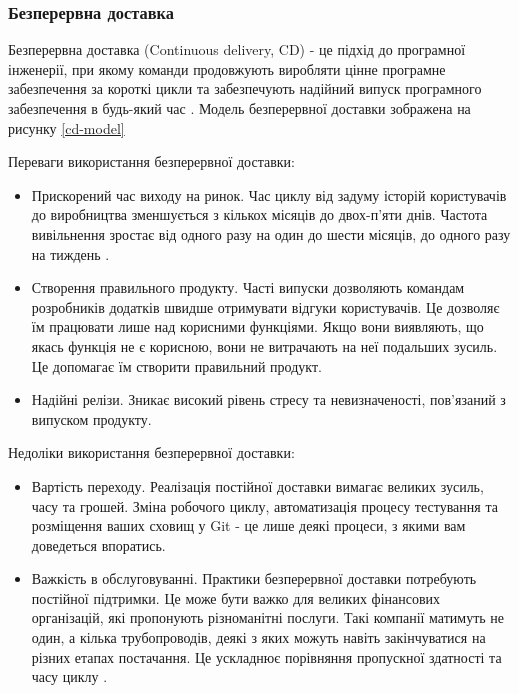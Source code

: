 \subsubsection{Безперервна доставка}

Безперервна доставка (Continuous delivery, CD) - це підхід до програмної інженерії,
при якому команди продовжують виробляти цінне програмне забезпечення
за короткі цикли та забезпечують надійний випуск програмного
забезпечення в будь-який час \cite{cd-chen}.
Модель безперервної доставки зображена на рисунку \ref{cd-model}


\clearpage
Переваги використання безперервної доставки:

\begin{itemize}
    \item Прискорений час виходу на ринок. Час циклу від задуму
      історій користувачів до виробництва зменшується з кількох місяців
      до двох-п'яти днів. Частота вивільнення зростає від 
      одного разу на один до шести місяців, до одного разу на тиждень \cite{cd-chen}.
    \item Створення правильного продукту. Часті випуски дозволяють
      командам розробників додатків швидше отримувати відгуки
      користувачів. Це дозволяє їм працювати лише над корисними функціями.
      Якщо вони виявляють, що якась функція не є корисною,
      вони не витрачають на неї подальших зусиль. Це допомагає їм створити правильний продукт.
    \item Надійні релізи. Зникає високий рівень стресу та невизначеності,
      пов'язаний з випуском продукту. 
\end{itemize}

Недоліки використання безперервної доставки:

\begin{itemize}
    \item Вартість переходу. Реалізація постійної доставки вимагає
      великих зусиль, часу та грошей. Зміна робочого циклу,
      автоматизація процесу тестування та розміщення ваших
      сховищ у Git - це лише деякі процеси, з якими вам доведеться впоратись.
    \item Важкість в обслуговуванні.  Практики безперервної доставки потребують
      постійної підтримки. Це може бути важко для великих фінансових організацій,
      які пропонують різноманітні послуги. Такі компанії матимуть не один,
      а кілька трубопроводів, деякі з яких можуть навіть закінчуватися
      на різних етапах постачання. Це ускладнює порівняння
      пропускної здатності та часу циклу \cite{cd-article}.
\end{itemize}


